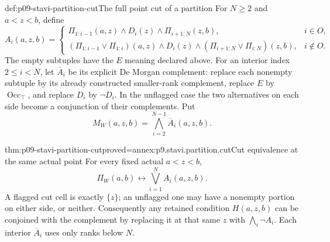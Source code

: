\begin{hbdefinition}{def:p09-stavi-partition-cut}{The full point cut of a partition}
For \(N\geq2\) and \(a<z<b\), define
\[
 A_i(a,z,b)=
 \begin{cases}
  \Pi_{1:i-1}(a,z)\land D_i(z)\land\Pi_{i+1:N}(z,b),&i\in O,\\
  (\Pi_{1:i-1}\lor\Pi_{1:i})(a,z)\land D_i(z)
       \land(\Pi_{i+1:N}\lor\Pi_{i:N})(z,b),&i\notin O.
 \end{cases}
\]
The empty subtuples have the \(E\) meaning
declared above. For an interior index
\(2\leq i<N\), let \(\overline A_i\)
be its explicit De Morgan complement:
replace each nonempty subtuple by its
already constructed smaller-rank complement,
replace \(E\) by \(\operatorname{Occ}_{\top}\),
and replace \(D_i\) by \(\neg D_i\).
In the unflagged case the two alternatives
on each side become a conjunction of
their complements. Put
\[
                       M_W(a,z,b)=\bigwedge_{i=2}^{N-1}\overline A_i(a,z,b).
\]
\end{hbdefinition}

\begin{hblemma}{thm:p09-stavi-partition-cut}{proved=annex:p9.stavi.partition.cut}{Cut equivalence at the same actual point}
For every fixed actual \(a<z<b\),
\[
                      \Pi_W(a,b)\longleftrightarrow\bigvee_{i=1}^N A_i(a,z,b).
\]
A flagged cut cell is exactly \(\{z\}\);
an unflagged one may have a nonempty
portion on either side, or neither.
Consequently any retained condition
\(H(a,z,b)\) can be conjoined with
the complement by replacing it at
that same \(z\) with
\(\bigwedge_i\neg A_i\).
Each interior \(\overline A_i\)
uses only ranks below \(N\).
\end{hblemma}

